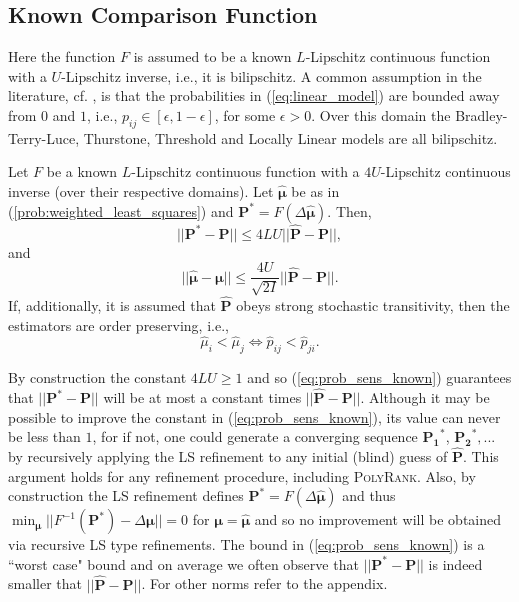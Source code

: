 \documentclass[twoside,11pt]{article}
\begin{document}
\subsection{Known Comparison Function}
Here the function $F$ is assumed to be a known $L$-Lipschitz continuous function with a $U$-Lipschitz inverse, i.e., it is bilipschitz. A common assumption in the literature, cf. \citet{shah2,shah}, is that the probabilities in  (\ref{eq:linear_model}) are bounded away from $0$ and $1$, i.e., $p_{ij} \in [\epsilon,  1-\epsilon]$, for some $\epsilon > 0$. Over this domain the Bradley-Terry-Luce, Thurstone, Threshold and Locally Linear models are all bilipschitz.
\begin{theorem}%
\label{the:sensitivity_LS}
Let $F$ be a known $L$-Lipschitz continuous function with a $4U$-Lipschitz continuous inverse (over their respective domains). Let $\boldsymbol{\hat \mu} $ be as in (\ref{prob:weighted_least_squares}) and $\boldsymbol{P^*} = F(\Delta \boldsymbol{\hat \mu})$. Then,  
\begin{equation}
\label{eq:prob_sens_known}||\boldsymbol{P^*} - \boldsymbol{P}||  \leq 4L U  ||\boldsymbol{\hat{P}} - \boldsymbol{P}||, \end{equation}
 and
 \begin{equation}
 \label{eq:merit_sens_known}|| \boldsymbol{\hat{\mu}} - \boldsymbol{\mu}||  \leq \frac{4U}{\sqrt{2I}}  || \boldsymbol{\hat{P}} - \boldsymbol{P}||.\end{equation}
If, additionally, it is assumed that $\boldsymbol{\hat P}$ obeys strong stochastic transitivity, then the estimators are order preserving, i.e.,
\begin{equation}\hat{\mu}_{i} < \hat{\mu}_{j} \iff \hat{p}_{ij} < \hat{p}_{ji}.\end{equation}
\end{theorem}

By construction the constant $4LU \geq 1$ and so (\ref{eq:prob_sens_known}) guarantees that $||\boldsymbol{P^*} - \boldsymbol{P}||$ will be at most a constant times $||\boldsymbol{\hat{P}} - \boldsymbol{P}||$. Although it may be possible to improve the constant in (\ref{eq:prob_sens_known}), its value can never be less than $1$, for if not, one could generate a converging sequence $\boldsymbol{P_{1}}^*$, $\boldsymbol{P_{2}}^*,...$ by recursively applying  the LS refinement to any initial (blind) guess of $\boldsymbol{\hat P}$. This argument holds for any refinement procedure,  including \textsc{PolyRank}. Also, by construction  the LS refinement defines $\boldsymbol{P}^*= F(\Delta \boldsymbol{\hat{\mu}})$ and thus $\min_{\boldsymbol{\mu}} ||F^{-1}(\boldsymbol{P}^*) - \Delta \boldsymbol{\mu}|| = 0$ for  $\boldsymbol{\mu}=\boldsymbol{\hat{\mu}}$ and so no improvement will be obtained via recursive LS type refinements. The bound in (\ref{eq:prob_sens_known}) is a ``worst case" bound and on average we often observe that $||\boldsymbol{P^*} - \boldsymbol{P}||$ is indeed smaller that $||\boldsymbol{\hat{P}} - \boldsymbol{P}||$. For  other norms refer to the appendix.
\end{document}
